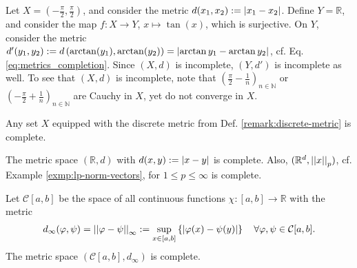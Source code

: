 \begin{exmp}\label{exmp:r_with_arctan_metric}
	Let $X = \left(-\frac{\pi}{2}, \frac{\pi}{2}\right)$, and consider the metric $d(x_1, x_2) := \left\vert x_1 - x_2 \right\vert$. Define $Y = \mathbb R$, and consider the map $f: X\to Y$, $x\mapsto \tan(x)$, which is surjective. On $Y$, consider the metric $d'(y_1, y_2) := d\left( \arctan(y_1), \arctan(y_2)\right) = \left\vert \arctan y_1 - \arctan y_2 \right\vert$, cf. Eq. \eqref{eq:metrics_completion}. Since $(X, d)$ is incomplete, $(Y, d')$ is incomplete as well. To see that $(X, d)$ is incomplete, note that $\left(\frac{\pi}{2} - \frac{1}{n}\right)_{n\in\mathbb N}$ or $\left( -\frac{\pi}{2} + \frac{1}{n} \right)_{n\in\mathbb N}$ are Cauchy in $X$, yet do not converge in $X$.
\end{exmp}

\begin{exmp}
	Any set $X$ equipped with the discrete metric from Def. \ref{remark:discrete-metric} is complete.
\end{exmp}

\begin{exmp}
	The metric space $(\mathbb R, d)$ with $d(x, y) := \left\vert x - y \right\vert$ is \mbox{complete}. Also, $(\mathbb R^{d}, \left\vert\left\vert x \right\vert\right\vert_{p})$, cf. Example \ref{exmp:lp-norm-vectors}, for $1\leq p\leq \infty$ is complete.
\end{exmp}

\begin{exmp}\label{exmp:space-continuous-functions-complete}
	Let $\mathcal C[a, b]$ be the space of all continuous functions $\chi: [a, b]\to\mathbb{R}$ with the metric 
	\begin{align}
		d_{\infty}(\varphi, \psi) = \left\vert\left\vert \varphi - \psi \right\vert\right\vert_{\infty} :=  \sup_{x\in [a, b]}\left\{ \left\vert \varphi(x) - \psi(y) \right\vert \right\}\quad \forall \varphi, \psi\in\mathcal C[a, b].
	\end{align}
	The metric space $(\mathcal C[a, b], d_{\infty})$ is complete.
\end{exmp}

